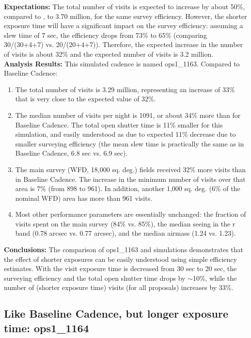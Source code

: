 {\bf Expectations:} The total number of visits is expected to increase by about 50\%,
compared to , to 3.70 million, for the same survey efficiency.
However, the shorter exposure time will have a significant impact on
the survey efficiency: assuming a slew time of 7 sec, the efficiency drops from
73\% to 65\% (comparing 30/(30+4+7) vs. 20/(20+4+7)). Therefore, the expected
increase in the number of visits is about 32\% and the expected number of visits
is 3.2 million.  \\

{\bf Analysis Results:}  This simulated cadence is named ops1\_1163. Compared to Baseline Cadence:
\begin{enumerate}
\item The total number of visits is 3.29 million, representing an increase of 33\% that is very
close to the expected value of 32\%.
\item The median number of visits per night is 1091, or about 34\% more than for Baseline Cadence.
The total open shutter time is 11\% smaller for this simulation, and easily understood as due to
expected 11\% decrease due to smaller surveying efficiency (the mean slew time is practically
the same as in Baseline Cadence, 6.8 sec vs. 6.9 sec).
\item The main survey (WFD, 18,000 sq. deg.) fields received 32\% more visits than in Baseline Cadence.
The increase in the minimum number of visits over that area is 7\% (from 898 to 961). In addition,
another 1,000 sq. deg. (6\% of the nominal WFD) area has more than 961 visits.
\item Most other performance parameters are essentially unchanged: the fraction of visits spent
on the main survey (84\% vs. 85\%), the median seeing in the r band (0.78 arcsec vs. 0.77 arcsec),
and the median airmass (1.24 vs. 1.23).
\end{enumerate}

{\bf Conclusions:}
The comparison of ops1\_1163 and  simulations demonstrates
that the effect of shorter exposures can be easily understood using simple efficiency
estimates. With the visit exposure time is decreased from 30 sec to 20 sec, the surveying
efficiency and the total open shutter time drops by $\sim$10\%, while the number
of (shorter exposure time) visits (for all proposals) increases by 33\%.





\subsection{Like Baseline Cadence, but longer exposure time: ops1\_1164}


